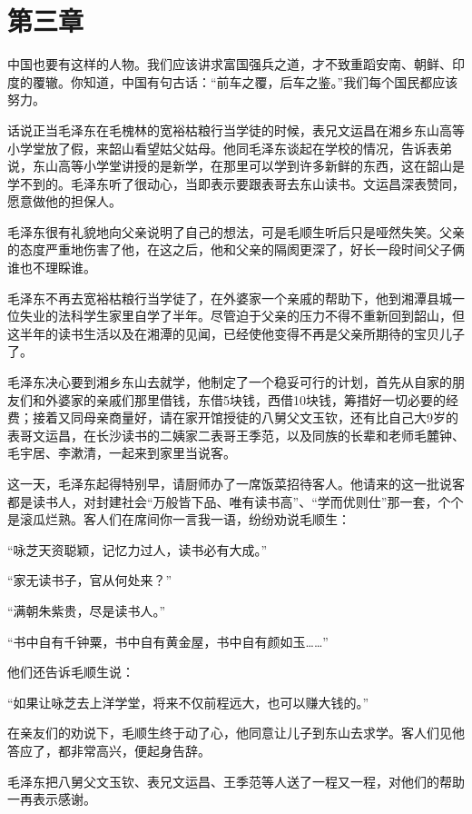 \documentclass[../../dazhuan.tex]{subfiles}
\begin{document}
\chapter*{第三章}

\begin{pref}
中国也要有这样的人物。我们应该讲求富国强兵之道，才不致重蹈安南、朝鲜、印度的覆辙。你知道，中国有句古话：“前车之覆，后车之鉴。”我们每个国民都应该努力。
\end{pref}

话说正当毛泽东在毛槐林的宽裕枯粮行当学徒的时候，表兄文运昌在湘乡东山高等小学堂放了假，来韶山看望姑父姑母。他同毛泽东谈起在学校的情况，告诉表弟说，东山高等小学堂讲授的是新学，在那里可以学到许多新鲜的东西，这在韶山是学不到的。毛泽东听了很动心，当即表示要跟表哥去东山读书。文运昌深表赞同，愿意做他的担保人。

毛泽东很有礼貌地向父亲说明了自己的想法，可是毛顺生听后只是哑然失笑。父亲的态度严重地伤害了他，在这之后，他和父亲的隔阂更深了，好长一段时间父子俩谁也不理睬谁。

毛泽东不再去宽裕枯粮行当学徒了，在外婆家一个亲戚的帮助下，他到湘潭县城一位失业的法科学生家里自学了半年。尽管迫于父亲的压力不得不重新回到韶山，但这半年的读书生活以及在湘潭的见闻，已经使他变得不再是父亲所期待的宝贝儿子了。

毛泽东决心要到湘乡东山去就学，他制定了一个稳妥可行的计划，首先从自家的朋友们和外婆家的亲戚们那里借钱，东借5块钱，西借10块钱，筹措好一切必要的经费；接着又同母亲商量好，请在家开馆授徒的八舅父文玉钦，还有比自己大9岁的表哥文运昌，在长沙读书的二姨家二表哥王季范，以及同族的长辈和老师毛麓钟、毛宇居、李漱清，一起来到家里当说客。

这一天，毛泽东起得特别早，请厨师办了一席饭菜招待客人。他请来的这一批说客都是读书人，对封建社会“万般皆下品、唯有读书高”、“学而优则仕”那一套，个个是滚瓜烂熟。客人们在席间你一言我一语，纷纷劝说毛顺生：

“咏芝天资聪颖，记忆力过人，读书必有大成。”

“家无读书子，官从何处来？”

“满朝朱紫贵，尽是读书人。”

“书中自有千钟粟，书中自有黄金屋，书中自有颜如玉……”

他们还告诉毛顺生说：

“如果让咏芝去上洋学堂，将来不仅前程远大，也可以赚大钱的。”

在亲友们的劝说下，毛顺生终于动了心，他同意让儿子到东山去求学。客人们见他答应了，都非常高兴，便起身告辞。

毛泽东把八舅父文玉钦、表兄文运昌、王季范等人送了一程又一程，对他们的帮助一再表示感谢。
\end{document}

